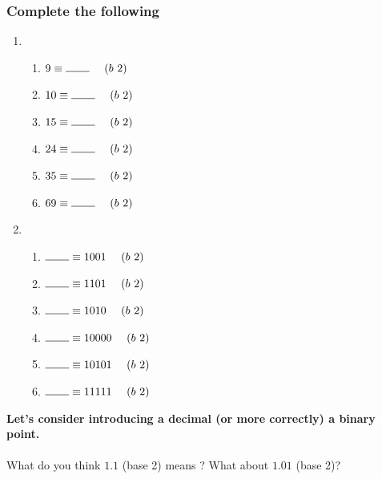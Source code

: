 \documentclass[a4paper,12pt]{article}
\begin{document}
\subsubsection{Complete the following}
\begin{enumerate}
\item ~ \begin{multicols}{2}
\begin{enumerate}[label= \roman*)]
\item $9 \equiv \rule{7.5mm}{0.15mm}~~~~(b~2)$
\item $10 \equiv \rule{7.5mm}{0.15mm}~~~~(b~2)$
\item $15 \equiv \rule{7.5mm}{0.15mm}~~~~(b~2)$
\item $24 \equiv \rule{7.5mm}{0.15mm}~~~~(b~2)$
\item $35 \equiv \rule{7.5mm}{0.15mm}~~~~(b~2)$
\item $69 \equiv \rule{7.5mm}{0.15mm}~~~~(b~2)$
\end{enumerate}
\end{multicols}
\item ~ \begin{multicols}{2}
\begin{enumerate}[label= \roman*)]
\item $\rule{7.5mm}{0.15mm} \equiv 1001 ~~~~(b~2)$
\item $\rule{7.5mm}{0.15mm} \equiv 1101 ~~~~(b~2)$
\item $\rule{7.5mm}{0.15mm} \equiv 1010 ~~~~(b~2)$
\item $\rule{7.5mm}{0.15mm} \equiv 10000 ~~~~(b~2)$
\item $\rule{7.5mm}{0.15mm} \equiv 10101 ~~~~(b~2)$
\item $\rule{7.5mm}{0.15mm} \equiv 11111 ~~~~(b~2)$
\end{enumerate}
\end{multicols}
\end{enumerate}
\textbf{Let's consider introducing a decimal (or more correctly) a binary point.}\\\\
What do you think $1.1$ (base 2) means ? What about $1.01$ (base 2)?
\end{document}

